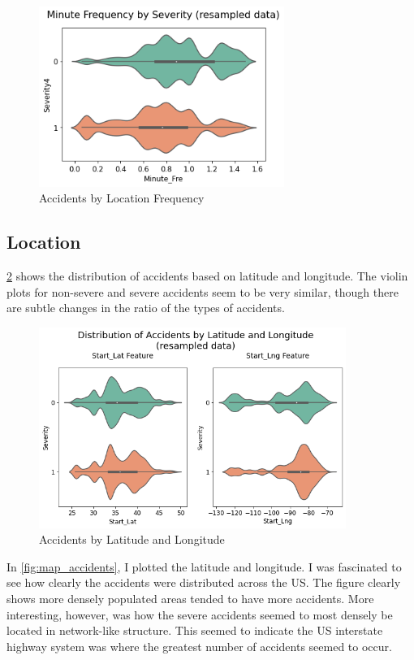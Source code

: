 \begin{figure}[H]
    \centering
    \includegraphics[width=80mm,height=\textheight,keepaspectratio]{images/violin_minute.png}
    \caption{Accidents by Location Frequency}
    \label{fig:violin_minute}
\end{figure}

\subsection{Location}
\cref{fig:violin_lat_lng} shows the distribution of accidents based on latitude and longitude. The violin plots for non-severe and severe accidents seem to be very similar, though there are subtle changes in the ratio of the types of accidents.

\begin{figure}[H]
    \centering
    \includegraphics[width=100mm,height=\textheight,keepaspectratio]{images/violin_lat_lng.png}
    \caption{Accidents by Latitude and Longitude}
    \label{fig:violin_lat_lng}
\end{figure}

In \cref{fig:map_accidents}, I plotted the latitude and longitude. I was fascinated to see how clearly the accidents were distributed across the US. The figure clearly shows more densely populated areas tended to have more accidents. More interesting, however, was how the severe accidents seemed to most densely be located in network-like structure. This seemed to indicate the US interstate highway system was where the greatest number of accidents seemed to occur.

